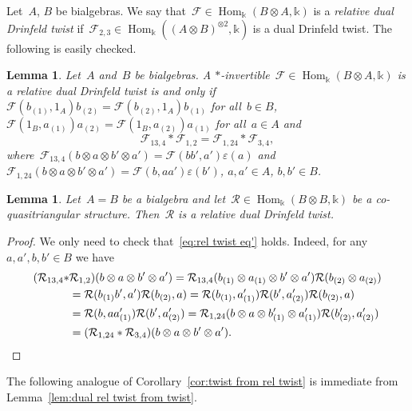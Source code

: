 \documentclass[12pt, reqno]{amsart}
\newtheorem{lemma}[theorem]{Lemma}
\theoremstyle{definition}
\numberwithin{equation}{section}
\newcommand{\tensor}{\otimes}
\newcommand{\kk}{\mathbb{k}}\newcommand{\lie}[1]{{\mathfrak{#1}}}
\DeclareMathOperator{\Hom}{Hom}
\begin{document}
Let~$A$, $B$ be bialgebras. We say that~$\mathcal F\in\Hom_\kk(B\tensor A,\kk)$ is a {\em relative dual Drinfeld twist} if~$\mathcal F_{2,3}\in\Hom_\kk((A\tensor B)^{\tensor 2},\kk)$
is a dual Drinfeld twist. 
The following is easily checked. 
\begin{lemma}\label{eq:}
Let~$A$ and~$B$ be bialgebras. 
A $\ast$-invertible~$\mathcal F\in\Hom_\kk(B\tensor A,\kk)$
is a relative dual Drinfeld twist is and only if
$\mathcal F(b_{(1)},1_A)b_{(2)}=\mathcal F(b_{(2)},1_A)b_{(1)}$ for all~$b\in B$,
$\mathcal F(1_B,a_{(1)})a_{(2)}=
\mathcal F(1_B,a_{(2)})a_{(1)}$ for all~$a\in A$ and
\begin{equation}\label{eq:rel twist eq'}
\mathcal F_{13,4}\ast \mathcal F_{1,2}=\mathcal F_{1,24}\ast \mathcal F_{3,4},
\end{equation}
where~$\mathcal F_{13,4}(b\tensor a\tensor b'\tensor a')=
\mathcal F(bb',a')\varepsilon(a)$ and~$\mathcal F_{1,24}(b\tensor a
\tensor b'\tensor a')=
\mathcal F(b,aa')\varepsilon(b')$, $a,a'\in A$, $b,b'\in B$.
\end{lemma}
\begin{lemma}\label{lem:basic rel dual}
Let~$A=B$ be a bialgebra and let~$\mathcal R\in\Hom_\kk(B\tensor B,\kk)$ be a co-quasi\-tri\-angular structure. Then~$\mathcal R$
is a relative dual Drinfeld twist.
\end{lemma}
\begin{proof}
We only need to check that~\eqref{eq:rel twist eq'} holds.
Indeed, for any~$a,a',b,b'\in B$ we have 
\begin{align*}
(\mathcal R_{13,4}\ast &\mathcal R_{1,2})(b\tensor a\tensor b'\tensor a')=\mathcal R_{13,4}(b_{(1)}\tensor a_{(1)}\tensor b'\tensor a')\mathcal R(b_{(2)}\tensor a_{(2)})\\
&=\mathcal R(b_{(1)}b',a')\mathcal R(b_{(2)},a)
=\mathcal R(b_{(1)},a'_{(1)})\mathcal R(b',a'_{(2)})
\mathcal R(b_{(2)},a)\\
&=\mathcal R(b,aa'_{(1)})\mathcal R(b',a'_{(2)})
=\mathcal R_{1,24}(b\tensor a\tensor b'_{(1)}\tensor a'_{(1)})\mathcal R(b'_{(2)},a'_{(2)})\\
&=(\mathcal R_{1,24}\ast \mathcal R_{3,4})(b\tensor a\tensor b'\tensor a').\qedhere
\end{align*}
\end{proof}
The following analogue
of Corollary~\ref{cor:twist from rel twist} is immediate from Lemma~\ref{lem:dual rel twist from twist}.
\end{document}
